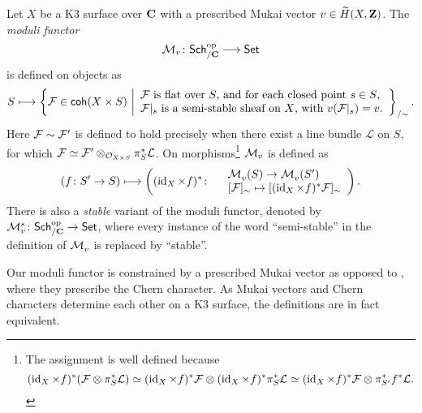 \begin{definition}
    \label{Definition of moduli functor}
    Let $X$ be a K3 surface over $\mathbf C$ with a prescribed Mukai vector $v \in \widetilde{H}(X, \mathbf Z)$. The \emph{moduli functor}
    \[
        \mathcal M_v \colon \mathsf{Sch}_{/\mathbf C}^{\text{op}} \longrightarrow \mathsf{Set}
    \]
    is defined on objects as 
    \[
        S \longmapsto \left\{\mathcal F \in \mathsf{coh}(X \times S) \ \middle| 
        \begin{array}{l}
            \text{$\mathcal F$ is flat over $S$, and for each closed point $s \in S$,} \\
            \text{$\mathcal F|_s$ is a semi-stable sheaf on $X$, with $v(\mathcal F|_s) = v$.}
        \end{array}
        \right\}_{/\sim}.
    \]
    Here $\mathcal F \sim \mathcal F'$ is defined to hold precisely when there exist a line bundle $\mathcal L$ on $S$, for which $\mathcal F \simeq \mathcal F' \otimes_{{\mathcal{O}_{X \times S}}} \pi_S^*\mathcal L$. On morphisms\footnote{
        The assignment is well defined because
        \[
            (\operatorname{id}_{X} \times f)^*(\mathcal F \otimes \pi_S^*\mathcal L) \simeq (\operatorname{id}_{X} \times f)^*\mathcal F \otimes (\operatorname{id}_{X} \times f)^*\pi_S^*\mathcal L \simeq (\operatorname{id}_{X} \times f)^*\mathcal F \otimes \pi_{S'}^*f^*\mathcal L.
        \]
    } $\mathcal M_v$ is defined as
    \[
        (f\colon S' \to S) \longmapsto \left( (\operatorname{id}_{X} \times f)^* \colon
            \begin{array}{r l}
                & \mathcal M^{}_v(S) \to \mathcal M^{}_v(S') \\
                & [\mathcal F]_\sim \mapsto [(\operatorname{id}_{X} \times f)^*\mathcal F]_\sim
            \end{array}
            \right).
    \]
    There is also a \emph{stable} variant of the moduli functor, denoted by $\mathcal M_v^{s} \colon \mathsf{Sch}_{/\mathbf C}^{\text{op}} \to \mathsf{Set}$, where every instance of the word ``semi-stable'' in the definition of $\mathcal M_v^{}$ is replaced by ``stable''.
\end{definition}

\begin{remark}
    Our moduli functor is constrained by a prescribed Mukai vector as opposed to \cite[\S 4.2, Proposition 4.15]{vanBree2020}, where they prescribe the Chern character.
    As Mukai vectors and Chern characters determine each other on a K3 surface, the definitions are in fact equivalent. 
\end{remark}

